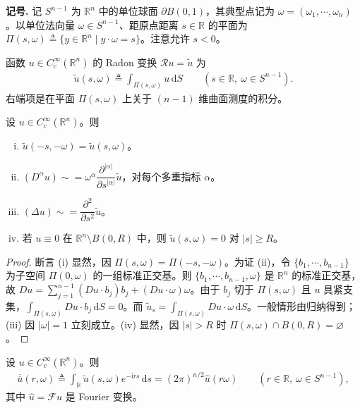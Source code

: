 \documentclass[../../main.tex]{subfiles}
\begin{document}
\textbf{记号.} 记 $S^{n-1}$ 为 $\mathbb{R}^n$ 中的单位球面 $\partial B(0,1)$，其典型点记为 $\omega=(\omega_1,\cdots,\omega_n)$。以单位法向量 $\omega\in S^{n-1}$、距原点距离 $s\in\mathbb{R}$ 的平面为 $\Pi(s,\omega)\triangleq\{y\in\mathbb{R}^n\mid y\cdot\omega=s\}$。注意允许 $s<0$。

\begin{definition}\label{definition:ch04-radon}
函数 $u\in C_c^\infty(\mathbb{R}^n)$ 的 Radon 变换 $\mathcal{R}u=\widetilde{u}$ 为
\begin{align}\label{align:ch04-radon-def}
\widetilde{u}(s,\omega)\triangleq\int_{\Pi(s,\omega)}u\,\mathrm{d}S \qquad(s\in\mathbb{R},\ \omega\in S^{n-1}).
\end{align}
右端项是在平面 $\Pi(s,\omega)$ 上关于 $(n-1)$ 维曲面测度的积分。
\end{definition}

\begin{theorem}\label{theorem:ch04-radon-props}设 $u\in C_c^\infty(\mathbb{R}^n)$。则
\begin{enumerate}[(i)]
\item $\widetilde{u}(-s,-\omega)=\widetilde{u}(s,\omega)$。
\item $(D^\alpha u)\sim=\omega^\alpha\dfrac{\partial^{|\alpha|}}{\partial s^{|\alpha|}}\widetilde{u}$，对每个多重指标 $\alpha$。
\item $(\Delta u)\sim=\dfrac{\partial^2}{\partial s^2}\widetilde{u}$。
\item 若 $u\equiv 0$ 在 $\mathbb{R}^n\setminus B(0,R)$ 中，则 $\widetilde{u}(s,\omega)=0$ 对 $|s|\geqslant R$。
\end{enumerate}
\end{theorem}

\begin{proof}
断言 (i) 显然，因 $\Pi(s,\omega)=\Pi(-s,-\omega)$。为证 (ii)，令 $\{b_1,\cdots,b_{n-1}\}$ 为子空间 $\Pi(0,\omega)$ 的一组标准正交基。则 $\{b_1,\cdots,b_{n-1},\omega\}$ 是 $\mathbb{R}^n$ 的标准正交基，故 $Du=\sum_{j=1}^{n-1}(Du\cdot b_j)b_j+(Du\cdot\omega)\omega$。由于 $b_j$ 切于 $\Pi(s,\omega)$ 且 $u$ 具紧支集，$\int_{\Pi(s,\omega)}Du\cdot b_j\,\mathrm{d}S=0$。而 $\widetilde{u}_s=\int_{\Pi(s,\omega)}Du\cdot\omega\,\mathrm{d}S$。一般情形由归纳得到；(iii) 因 $|\omega|=1$ 立刻成立。(iv) 显然，因 $|s|>R$ 时 $\Pi(s,\omega)\cap B(0,R)=\varnothing$。
\end{proof}

\begin{theorem}\label{theorem:ch04-radon-fourier}设 $u\in C_c^\infty(\mathbb{R}^n)$。则
\begin{align}\label{align:ch04-radon-fourier}
\overline{\overline{u}}(r,\omega)\triangleq\int_{\mathbb{R}}\widetilde{u}(s,\omega)e^{-\mathrm{i}rs}\,\mathrm{d}s=(2\pi)^{n/2}\widehat{u}(r\omega) \qquad(r\in\mathbb{R},\ \omega\in S^{n-1}),
\end{align}
其中 $\widehat{u}=\mathcal{F}u$ 是 Fourier 变换。
\end{theorem}
\end{document}
